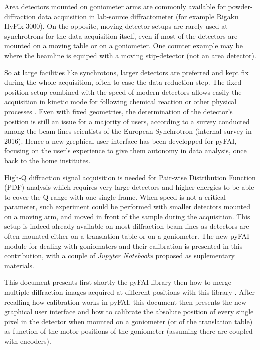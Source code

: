 \documentclass[preprint]{iucr}              %
\begin{document}
Area detectors mounted on goniometer arms are commonly available for
powder-diffraction data acquisition in lab-source diffractometer (for example
Rigaku HyPix-3000).
On the opposite, moving detector setups are rarely used at synchrotrons for
the data acquisition itself, even if most of the detectors are mounted on a
moving table or on a goniometer. 
One counter example may be \cite{Gao:kc5032} where the beamline is equiped with
a moving stip-detector (not an area detector).

So at large facilities like synchrotons, larger detectors are 
preferred and kept fix during the whole acquisition, often to ease the
data-reduction step.
The fixed position setup combined with the speed of modern detectors allows
easily the acquisition in kinetic mode for following chemical reaction or other
physical processes \cite{id15, id31}.
Even with fixed geometries, the determination of the detector's position is
still an issue for a majority of users, according to a survey conducted among 
the beam-lines scientists of the European Synchrotron (internal survey in 2016). 
Hence a new grephical user interface has been developped for pyFAI, focusing
on the user's experience to give them autonomy in data analysis, once back to the
home institutes.

High-Q diffraction signal acquisition is needed \cite{Chupas:wf5000} for
Pair-wise Distribution Function (PDF) analysis which requires very large
detectors and higher energies to be able to cover the Q-range with one single frame.
When speed is not a critical parameter, such experiment could be performed
with smaller detectors mounted on a moving arm, and moved in front of
the sample during the acquisition. 
This setup is indeed already available on most diffraction beam-lines as
detectors are often mounted either on a translation table or on a
goniometer. 
The new pyFAI module for dealing with goniomaters and their calibration is
presented in this contribution, with a couple of \textit{Jupyter Notebooks}
\cite{ipython} proposed as suplementary materials.

This document presents first shortly the pyFAI library \cite{fv5028} then how to
merge multiple diffraction images acquired at different positions with this
library \cite{PyFAI_PDJ}. 
After recalling how calibration works in pyFAI, this document then 
presents the new graphical user interface and how to
calibrate the absolute position of every single pixel in the detector when
mounted on a goniometer (or of the translation table) as function of the  motor
positions of the goniometer (assuming there are coupled with encoders). 
\end{document}
